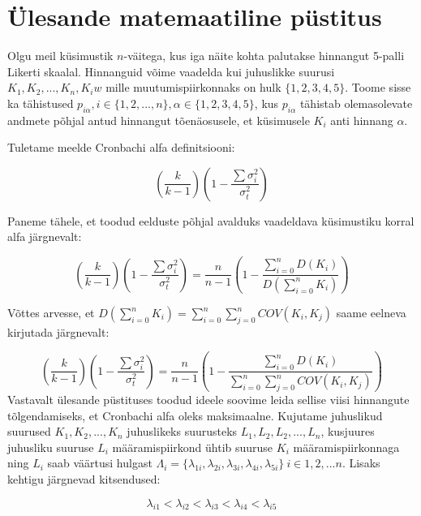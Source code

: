 \documentclass[a4paper,12pt]{article}
\numberwithin{equation}{section}
\theoremstyle{definition}
\begin{document}
\section{\"Ulesande matemaatiline p\"ustitus}

Olgu meil k\"usimustik $n$-väitega, kus iga näite kohta palutakse hinnangut 5-palli Likerti skaalal. Hinnanguid võime vaadelda kui juhuslikke suurusi $K_1,K_2,...,K_n, K_iw$ mille muutumispiirkonnaks on hulk $\{1,2,3,4,5\}$. Toome sisse ka tähistused $p_{i \alpha}, i \in \{1,2,...,n\}, \alpha \in \{1,2,3,4,5\}$, kus $p_{i \alpha}$ tähistab olemasolevate andmete põhjal antud hinnangut tõenäosusele, et k\"usimusele $K_i$ anti hinnang $\alpha$. 

Tuletame meelde Cronbachi alfa definitsiooni:


\begin{equation*}
(\frac{k}{k-1})( 1 - \frac{\sum \sigma_i^2}{\sigma_t^2})
\end{equation*}

Paneme tähele, et toodud eelduste põhjal avalduks vaadeldava k\"usimustiku korral alfa järgnevalt:

 
\begin{equation*}
(\frac{k}{k-1})( 1 - \frac{\sum \sigma_i^2}{\sigma_t^2}) = \frac{n}{n-1}\left(1 - \frac
{\sum \limits_{i=0}^n D(K_i)}{D(\sum \limits_{i=0}^n K_i)}\right)
\end{equation*}

Võttes arvesse, et $D(\sum \limits_{i=0}^n K_i) = \sum \limits_{i=0}^n \sum \limits_{j=0}^n COV(K_i,K_j)$ saame eelneva kirjutada järgnevalt:

\begin{equation*}
(\frac{k}{k-1})( 1 - \frac{\sum \sigma_i^2}{\sigma_t^2}) = \frac{n}{n-1}\left(1 - \frac
{\sum \limits_{i=0}^n D(K_i)}{\sum \limits_{i=0}^n \sum \limits_{j=0}^n COV(K_i,K_j)}\right)
\end{equation*}
Vastavalt \"ulesande p\"ustituses toodud ideele soovime leida sellise viisi hinnangute tõlgendamiseks, et Cronbachi alfa oleks maksimaalne. Kujutame juhuslikud suurused $K_1,K_2,...,K_n$ juhuslikeks suurusteks $L_1, L_2,L_2,...,L_n$, kusjuures juhusliku suuruse $L_i$ määramispiirkond \"uhtib suuruse $K_i$ määramispiirkonnaga ning $L_i$ saab väärtusi hulgast $\Lambda_i = \{\lambda_{1i},\lambda_{2i},\lambda_{3i},\lambda_{4i},\lambda_{5i}\} ~ i \in {1,2,...n}$. Lisaks kehtigu järgnevad kitsendused: 


\begin{equation*}
\lambda_{i1} < \lambda_{i2}  < \lambda_{i3} < \lambda_{i4} < \lambda_{i5}
\end{equation*}
\end{document}
